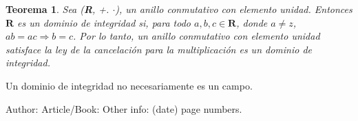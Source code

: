 \documentclass{llncs}
\theoremstyle{plane}
\newtheorem{teo}{Teorema}
\begin{document}
\begin{teo}
Sea (\textbf{R}, +. $\cdot$),  un anillo conmutativo con elemento unidad. Entonces $\mathbf{R}$ es un dominio de integridad si, para todo $a, b, c \in \mathbf{R}$, donde $a \neq z$, $ab=ac \Rightarrow b=c$. Por lo tanto, un anillo conmutativo con elemento unidad satisface la ley de la cancelación para la multiplicación es un dominio de integridad.
\end{teo}

Un dominio de integridad no necesariamente es un campo.











%
%

\begin{thebibliography}{1}
Author:
Article/Book:
Other info: (date) page numbers.
\end{thebibliography}
\end{document}
